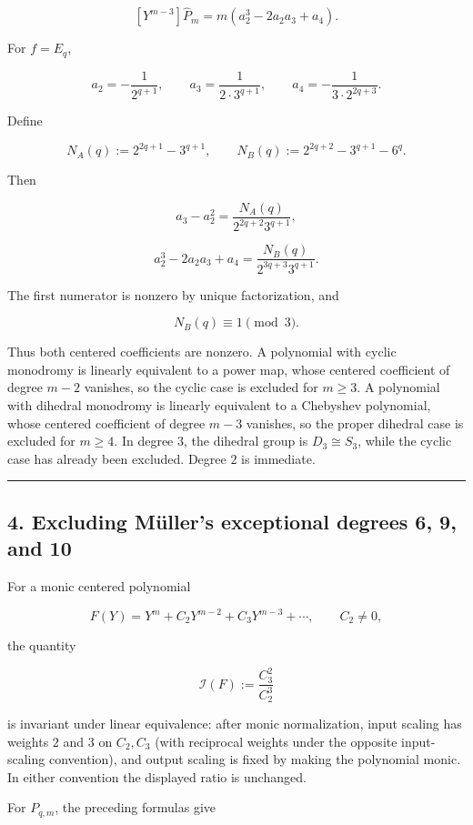 \documentclass[11pt]{article}
\theoremstyle{keio}
\theoremstyle{definition}
\theoremstyle{remark}
\begin{document}
\[
 [Y^{m-3}]\widehat P_m=m(a_2^3-2a_2a_3+a_4).
\]

For \(f=E_q\),

\[
 a_2=-\frac1{2^{q+1}},\qquad
 a_3=\frac1{2\cdot3^{q+1}},\qquad
 a_4=-\frac1{3\cdot2^{2q+3}}.
\]

Define

\[
 N_A(q):=2^{2q+1}-3^{q+1},
 \qquad
 N_B(q):=2^{2q+2}-3^{q+1}-6^q.
\]

Then

\[
 a_3-a_2^2
 =\frac{N_A(q)}{2^{2q+2}3^{q+1}},
\]

\[
 a_2^3-2a_2a_3+a_4
 =\frac{N_B(q)}{2^{3q+3}3^{q+1}}.
\]

The first numerator is nonzero by unique factorization, and

\[
 N_B(q)\equiv1\pmod3.
\]

Thus both centered coefficients are nonzero. A polynomial with cyclic
monodromy is linearly equivalent to a power map, whose centered coefficient
of degree \(m-2\) vanishes, so the cyclic case is excluded for \(m\ge3\).
A polynomial with dihedral monodromy is linearly
equivalent to a Chebyshev polynomial, whose centered coefficient of degree
\(m-3\) vanishes, so the proper dihedral case is excluded for \(m\ge4\).
In degree \(3\), the dihedral group is \(D_3\cong S_3\), while the cyclic
case has already been excluded. Degree \(2\) is immediate.

\begin{center}\rule{0.5\linewidth}{0.5pt}\end{center}

\subsection{4. Excluding Müller's exceptional degrees 6, 9, and 10}

For a monic centered polynomial

\[
 F(Y)=Y^m+C_2Y^{m-2}+C_3Y^{m-3}+\cdots,
 \qquad C_2\ne0,
\]

the quantity

\[
 \mathcal I(F):=\frac{C_3^2}{C_2^3}
\]

is invariant under linear equivalence: after monic normalization, input
scaling has weights \(2\) and \(3\) on \(C_2,C_3\) (with reciprocal weights
under the opposite input-scaling convention), and output scaling is fixed by
making the polynomial monic. In either convention the displayed ratio is
unchanged.

For \(P_{q,m}\), the preceding formulas give
\end{document}
